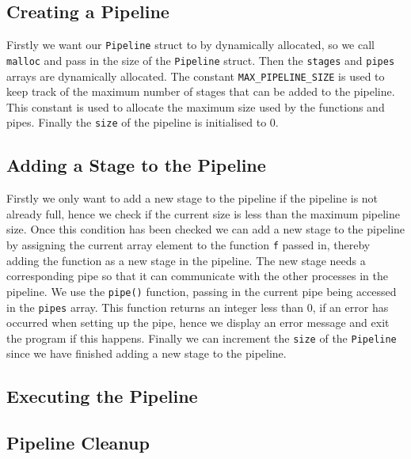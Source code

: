 \documentclass{article}
\begin{document}
    \subsection{Creating a Pipeline}
    Firstly we want our \verb+Pipeline+ struct to by dynamically allocated, so we call \verb+malloc+ and pass in the size of the \verb+Pipeline+ struct.
    Then the \verb+stages+ and \verb+pipes+ arrays are dynamically allocated.
    The constant \verb+MAX_PIPELINE_SIZE+ is used to keep track of the maximum number of stages that can be added to the pipeline.
    This constant is used to allocate the maximum size used by the functions and pipes.
    Finally the \verb+size+ of the pipeline is initialised to 0.
    
    \subsection{Adding a Stage to the Pipeline}
    Firstly we only want to add a new stage to the pipeline if the pipeline is not already full, hence we check if the current size is less than the maximum pipeline size.
    Once this condition has been checked we can add a new stage to the pipeline by assigning the current array element to the function \verb+f+ passed in, thereby adding the function as a new stage in the pipeline.
    The new stage needs a corresponding pipe so that it can communicate with the other processes in the pipeline.
    We use the \verb+pipe()+ function, passing in the current pipe being accessed in the \verb+pipes+ array.
    This function returns an integer less than 0, if an error has occurred when setting up the pipe, hence we display an error message and exit the program if this happens.
    Finally we can increment the \verb+size+ of the \verb+Pipeline+ since we have finished adding a new stage to the pipeline.
    
    \subsection{Executing the Pipeline}


    \subsection{Pipeline Cleanup}
    
\end{document}
